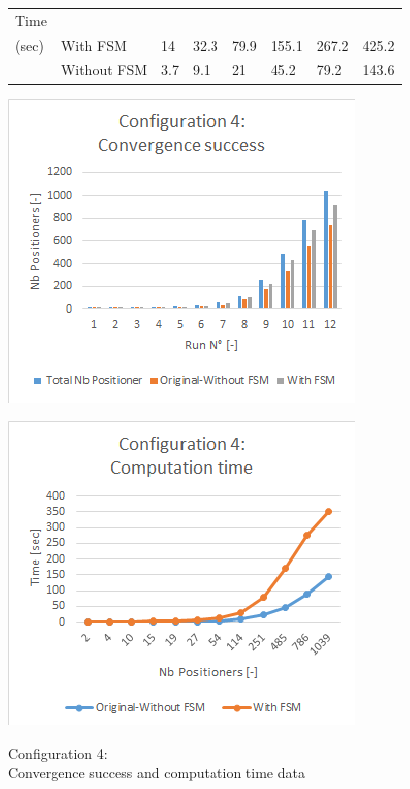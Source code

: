 \documentclass[]{spie}  %
\begin{document}
\begin{figure}[H]
\begin{minipage}{8.6cm}
{\begin{tabular}{|l|l|l|l|l|l|l|l|}
				\hline
				Time\\(sec) & With FSM  & 14 & 32.3  & 79.9 & 155.1 & 267.2 & 425.2 \\
				\cline{2-8}
				& Without FSM  & 3.7  & 9.1 & 21 & 45.2 & 79.2  & 143.6 \\
				\hline
			\end{tabular}
			}
			\label{configuration3_result} 
		\end{minipage}
		\begin{minipage}{7.5cm}
			\begin{minipage}[t]{4.2cm}
				\includegraphics[scale=0.56]{images/configuration4_conv}
				\label{configuration1_conv}
			\end{minipage}
			\begin{minipage}[t]{1.0cm}
				\includegraphics[scale=0.56]{images/configuration4_time}
				\label{configuration1_time}
			\end{minipage}
			\caption{\centering Configuration 4:\\
				Convergence success and computation time data
}
\end{minipage}
\end{figure}
\end{document}
